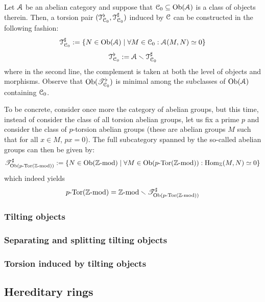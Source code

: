             \begin{example}
                Let $\mathcal{A}$ be an abelian category and suppose that $\mathcal{C}_0 \subseteq \mathrm{Ob}(\mathcal{A})$ is a class of objects therein. Then, a torsion pair $(\mathcal{T}^{\flat}_{\mathcal{C}_0}, \mathcal{T}^{\sharp}_{\mathcal{C}_0})$ induced by $\mathcal{C}$ can be constructed in the following fashion:
                    $$\mathcal{T}^{\sharp}_{\mathcal{C}_0} := \{N \in \mathrm{Ob}(\mathcal{A}) \mid \forall M \in \mathcal{C}_0 : \mathcal{A}(M, N) \simeq 0\}$$
                    $$\mathcal{T}^{\flat}_{\mathcal{C}_0} := \mathcal{A} \smallsetminus \mathcal{T}^{\sharp}_{\mathcal{C}_0}$$
                where in the second line, the complement is taken at both the level of objects and morphisms. Observe that $\mathrm{Ob}(\mathscr{T}^{\flat}_{\mathcal{C}_0})$ is minimal among the subclasses of $\mathrm{Ob}(\mathcal{A})$ containing $\mathcal{C}_0$.
                
                To be concrete, consider once more the category of abelian groups, but this time, instead of consider the class of all torsion abelian groups, let us fix a prime $p$ and consider the class of $p$-torsion abelian groups (these are abelian groups $M$ such that for all $x \in M$, $px = 0$). The full subcategory spanned by the so-called  abelian groups can then be given by:
                    $$\mathscr{T}^{\sharp}_{\mathrm{Ob}(p\text{-}\mathrm{Tor}(\mathbb{Z}\text{-}\mathrm{mod}))} := \{N \in \mathrm{Ob}(\mathbb{Z}\text{-}\mathrm{mod}) \mid \forall M \in \mathrm{Ob}(p\text{-}\mathrm{Tor}(\mathbb{Z}\text{-}\mathrm{mod})): \mathrm{Hom}_{\mathbb{Z}}(M, N) \simeq 0\}$$
                which indeed yields
                    $$p\text{-}\mathrm{Tor}(\mathbb{Z}\text{-}\mathrm{mod}) = \mathbb{Z}\text{-}\mathrm{mod} \smallsetminus \mathscr{T}^{\sharp}_{\mathrm{Ob}(p\text{-}\mathrm{Tor}(\mathbb{Z}\text{-}\mathrm{mod}))}$$
            \end{example}
            
        
        \subsubsection{Tilting objects}
        
        \subsubsection{Separating and splitting tilting objects}
        
        \subsubsection{Torsion induced by tilting objects}
        
    \subsection{Hereditary rings}    
